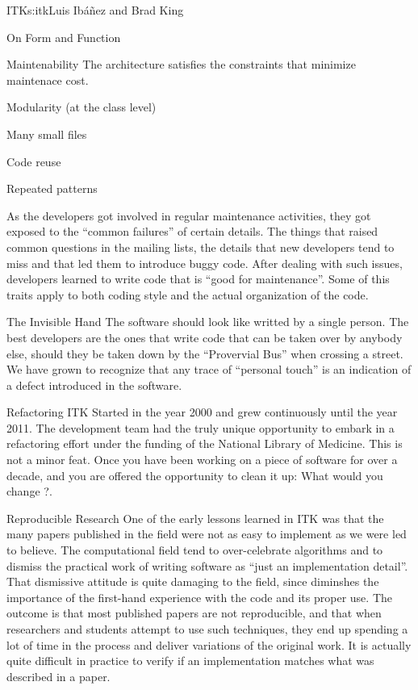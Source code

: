 \begin{aosachapter}{ITK}{s:itk}{Luis Ib\'{a}\~{n}ez and Brad King}
\begin{aosasect1}{On Form and Function}
\begin{aosasect2}{Maintenability}
The architecture satisfies the constraints that minimize maintenace cost.
\begin{aosaitemize}
\item Modularity (at the class level)
\item Many small files
\item Code reuse
\item Repeated patterns
\end{aosaitemize}
\end{aosasect2}
As the developers got involved in regular maintenance activities, they
got exposed to the ``common failures'' of certain details. The things
that raised common questions in the mailing lists, the details that
new developers tend to miss and that led them to introduce buggy code.
After dealing with such issues, developers learned to write code that
is ``good for maintenance''. Some of this traits apply to both coding
style and the actual organization of the code.

\begin{aosasect2}{The Invisible Hand}
The software should look like writted by a single person. The best
developers are the ones that write code that can be taken over by
anybody else, should they be taken down by the ``Provervial Bus'' when
crossing a street. We have grown to recognize that any trace of
``personal touch'' is an indication of a defect introduced in the
software.
\end{aosasect2}

\end{aosasect1}

\begin{aosasect1}{Refactoring}
ITK Started in the year 2000 and grew continuously until the year
2011. The development team had the truly unique opportunity to embark
in a refactoring effort under the funding of the National Library of
Medicine. This is not a minor feat. Once you have been working on a
piece of software for over a decade, and you are offered the
opportunity to clean it up: What would you change ?.
\end{aosasect1}

\begin{aosasect1}{Reproducible Research}
One of the early lessons learned in ITK was that the many papers
published in the field were not as easy to implement as we were led to
believe. The computational field tend to over-celebrate algorithms and
to dismiss the practical work of writing software as ``just an
implementation detail''. That dismissive attitude is quite damaging to
the field, since diminshes the importance of the first-hand experience
with the code and its proper use. The outcome is that most published papers
are not reproducible, and that when researchers and students attempt to use
such techniques, they end up spending a lot of time in the process and deliver
variations of the original work. It is actually quite difficult in practice
to verify if an implementation matches what was described in a paper.


\end{aosasect1}
\end{aosachapter}

